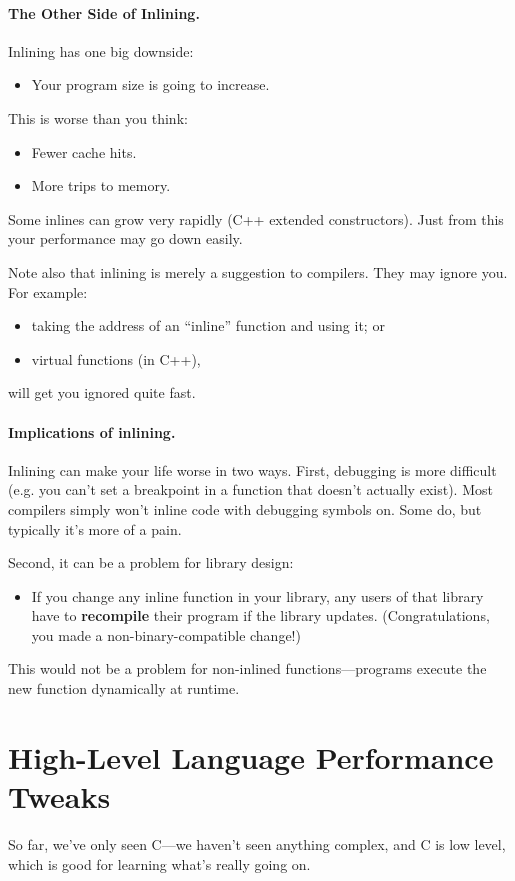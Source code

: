\documentclass[11pt]{article}
\newenvironment{itemizep}{
 \begin{itemize}
  \setlength{\itemsep}{0pt}
  \setlength{\parsep}{3pt}
  \setlength{\topsep}{3pt}
  \setlength{\partopsep}{0pt}
  \setlength{\leftmargin}{1.5em}
  \setlength{\labelwidth}{1em}
  \setlength{\labelsep}{0.5em} }
 {\end{itemize}}
\begin{document}
\paragraph{The Other Side of Inlining.}
Inlining has one big downside:
  \begin{itemizep}
    \item Your program size is going to increase.
  \end{itemizep}
   This is worse than you think:
      \begin{itemizep}
        \item Fewer cache hits.
        \item More trips to memory.
      \end{itemizep}
   Some inlines can grow very rapidly (C++ extended constructors).
  Just from this your performance may go down easily.

  Note also that inlining is merely a suggestion to compilers.
  They may ignore you.
  For example:
  \begin{itemizep}
    \item taking the address of an ``inline'' function and using it; or
    \item virtual functions (in C++),
  \end{itemizep}
  will get you ignored quite fast.

\paragraph{Implications of inlining.} Inlining can make your life worse in two ways.
First, debugging is more difficult (e.g. you can't set a breakpoint in a function that
  doesn't actually exist).
 Most compilers simply won't inline code with debugging symbols on.
 Some do, but typically it's more of a pain.

Second, it can be a problem for library design:
  \begin{itemizep}
    \item If you change any inline function in your library, any users
      of that library have to {\bf recompile} their program if the
      library updates. (Congratulations, you made a non-binary-compatible change!)
  \end{itemizep}
This would not be a problem for non-inlined functions---programs execute the new function
dynamically at runtime.

\section*{High-Level Language Performance Tweaks}
So far, we've only seen C---we haven't seen anything complex, and C is
low level, which is good for learning what's really going on.
\end{document}
